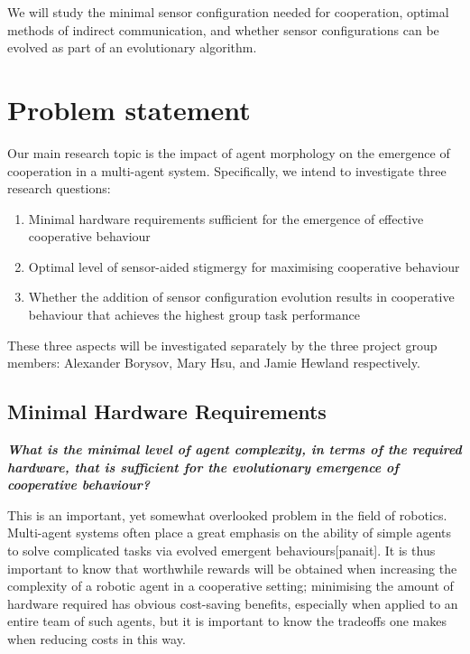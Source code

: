 \documentclass[a4paper,12pt]{article}
\begin{document}
We will study the minimal sensor configuration needed for cooperation, optimal methods of indirect communication, and whether sensor configurations can be evolved as part of an evolutionary algorithm.

\section{Problem statement}
Our main research topic is the impact of agent morphology on the emergence of cooperation in a multi-agent system. Specifically, we intend to investigate three research questions:

\begin{enumerate}
\item Minimal hardware requirements sufficient for the emergence of effective cooperative behaviour
\item Optimal level of sensor-aided stigmergy for maximising cooperative behaviour
\item Whether the addition of sensor configuration evolution results in cooperative behaviour that achieves the highest group task performance
\end{enumerate}

These three aspects will be investigated separately by the three project group members: Alexander Borysov, Mary Hsu, and Jamie Hewland respectively.

\subsection{Minimal Hardware Requirements}

\textbf{ \textit{What is the minimal level of agent complexity, in terms of the required hardware, that is sufficient for the evolutionary emergence of cooperative behaviour?}}

This is an important, yet somewhat overlooked problem in the field of robotics. Multi-agent systems often place a great emphasis on the ability of simple agents to solve complicated tasks via evolved emergent behaviours[panait]. It is thus important to know that worthwhile rewards will be obtained when increasing the complexity of a robotic agent in a cooperative setting; minimising the amount of hardware required has obvious cost-saving benefits, especially when applied to an entire team of such agents, but it is important to know the tradeoffs one makes when reducing costs in this way.
\end{document}
